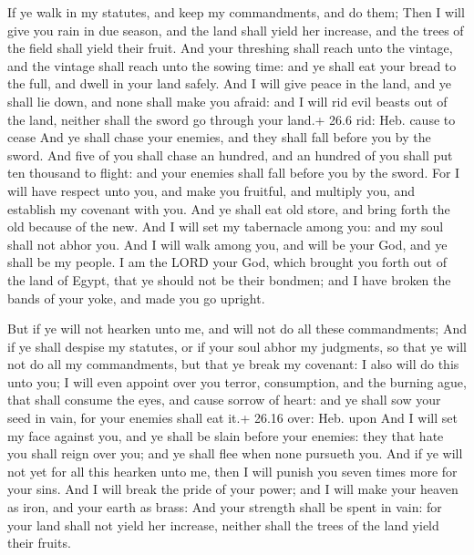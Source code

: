  If ye walk in my statutes, and keep my commandments, and
do them;  Then I will give you rain in due season, and the
land shall yield her increase, and the trees of the field shall yield
their fruit.  And your threshing shall reach unto the
vintage, and the vintage shall reach unto the sowing time: and ye shall
eat your bread to the full, and dwell in your land safely. 
And I will give peace in the land, and ye shall lie down, and none shall
make you afraid: and I will rid evil beasts out of the land, neither
shall the sword go through your land.+ 26.6 rid: Heb. cause to cease
 And ye shall chase your enemies, and they shall fall before
you by the sword.  And five of you shall chase an hundred,
and an hundred of you shall put ten thousand to flight: and your enemies
shall fall before you by the sword.  For I will have respect
unto you, and make you fruitful, and multiply you, and establish my
covenant with you.  And ye shall eat old store, and bring
forth the old because of the new.  And I will set my
tabernacle among you: and my soul shall not abhor you.  And
I will walk among you, and will be your God, and ye shall be my people.
 I am the LORD your God, which brought you forth out of the
land of Egypt, that ye should not be their bondmen; and I have broken
the bands of your yoke, and made you go upright.

 But if ye will not hearken unto me, and will not do all
these commandments;  And if ye shall despise my statutes,
or if your soul abhor my judgments, so that ye will not do all my
commandments, but that ye break my covenant:  I also will
do this unto you; I will even appoint over you terror, consumption, and
the burning ague, that shall consume the eyes, and cause sorrow of
heart: and ye shall sow your seed in vain, for your enemies shall eat
it.+ 26.16 over: Heb. upon  And I will set my face against
you, and ye shall be slain before your enemies: they that hate you shall
reign over you; and ye shall flee when none pursueth you. 
And if ye will not yet for all this hearken unto me, then I will punish
you seven times more for your sins.  And I will break the
pride of your power; and I will make your heaven as iron, and your earth
as brass:  And your strength shall be spent in vain: for
your land shall not yield her increase, neither shall the trees of the
land yield their fruits.

